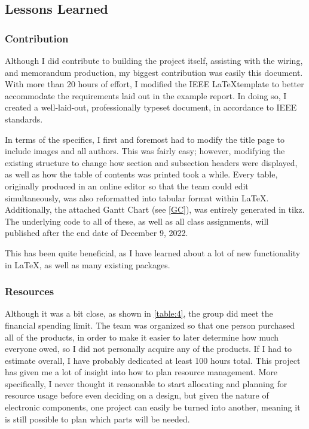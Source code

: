 \documentclass[conference]{IEEEtran}
\begin{document}
\subsection{Lessons Learned}

\subsubsection{Contribution}

\par Although I did contribute to building the project itself, assisting with the wiring, and memorandum production, my biggest contribution was easily this document. With more than 20 hours of effort, I modified the IEEE \LaTeX template to better accommodate the requirements laid out in the example report. In doing so, I created a well-laid-out, professionally typeset document, in accordance to IEEE standards.
\par In terms of the specifics, I first and foremost had to modify the title page to include images and all authors. This was fairly easy; however, modifying the existing structure to change how section and subsection headers were displayed, as well as how the table of contents was printed took a while. Every table, originally produced in an online editor so that the team could edit simultaneously, was also reformatted into tabular format within \LaTeX. Additionally, the attached Gantt Chart (see \ref{GC}), was entirely generated in tikz. The underlying code to all of these, as well as all class assignments, will published after the end date of December 9, 2022.
\par This has been quite beneficial, as I have learned about a lot of new functionality in \LaTeX, as well as many existing packages.

\subsubsection{Resources}

\par Although it was a bit close, as shown in \ref{table:4}, the group did meet the financial spending limit. The team was organized so that one person purchased all of the products, in order to make it easier to later determine how much everyone owed, so I did not personally acquire any of the products. If I had to estimate overall, I have probably dedicated at least 100 hours total. This project has given me a lot of insight into how to plan resource management. More specifically, I never thought it reasonable to start allocating and planning for resource usage before even deciding on a design, but given the nature of electronic components, one project can easily be turned into another, meaning it is still possible to plan which parts will be needed.
\end{document}
